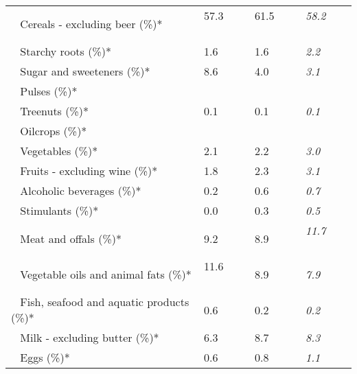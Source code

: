 \begin{tabular}{L{3.9cm} R{1cm} R{1cm} R{1cm}}
	 ~ Cereals - excluding beer (\%)* & 57.3 ~ \ \ & 61.5 ~ \ \ & \textit{58.2} ~ \ \ \\ 
	 ~ Starchy roots (\%)* & 1.6 ~ \ \ & 1.6 ~ \ \ & \textit{2.2} ~ \ \ \\ 
	 ~ Sugar and sweeteners (\%)* & 8.6 ~ \ \ & 4.0 ~ \ \ & \textit{3.1} ~ \ \ \\ 
	 ~ Pulses (\%)* &  ~ \ \ &  ~ \ \ &  ~ \ \ \\ 
	 ~ Treenuts (\%)* & 0.1 ~ \ \ & 0.1 ~ \ \ & \textit{0.1} ~ \ \ \\ 
	 ~ Oilcrops (\%)* &  ~ \ \ &  ~ \ \ &  ~ \ \ \\ 
	 ~ Vegetables (\%)* & 2.1 ~ \ \ & 2.2 ~ \ \ & \textit{3.0} ~ \ \ \\ 
	 ~ Fruits - excluding wine (\%)* & 1.8 ~ \ \ & 2.3 ~ \ \ & \textit{3.1} ~ \ \ \\ 
	 ~ Alcoholic beverages (\%)* & 0.2 ~ \ \ & 0.6 ~ \ \ & \textit{0.7} ~ \ \ \\ 
	 ~ Stimulants (\%)* & 0.0 ~ \ \ & 0.3 ~ \ \ & \textit{0.5} ~ \ \ \\ 
	 ~ Meat and offals (\%)* & 9.2 ~ \ \ & 8.9 ~ \ \ & \textit{11.7} ~ \ \ \\ 
	 ~ Vegetable oils and animal fats (\%)* & 11.6 ~ \ \ & 8.9 ~ \ \ & \textit{7.9} ~ \ \ \\ 
	 ~ Fish, seafood and aquatic products (\%)* & 0.6 ~ \ \ & 0.2 ~ \ \ & \textit{0.2} ~ \ \ \\ 
	 ~ Milk - excluding butter (\%)* & 6.3 ~ \ \ & 8.7 ~ \ \ & \textit{8.3} ~ \ \ \\ 
	 ~ Eggs (\%)* & 0.6 ~ \ \ & 0.8 ~ \ \ & \textit{1.1} ~ \ \ \\ 
       \toprule
      \end{tabular}
      \clearpage
{}
